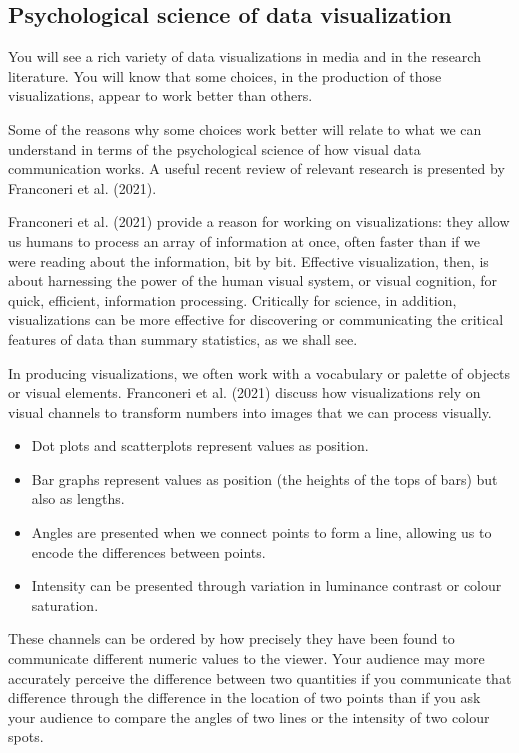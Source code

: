 \documentclass[
  letterpaper,
  DIV=11,
  numbers=noendperiod]{scrreprt}
\providecommand{\tightlist}{%
  \setlength{\itemsep}{0pt}\setlength{\parskip}{0pt}}\usepackage{longtable,booktabs,array}
\begin{document}
\hypertarget{sec-psychology-visualization}{%
\subsection{Psychological science of data
visualization}\label{sec-psychology-visualization}}

You will see a rich variety of data visualizations in media and in the
research literature. You will know that some choices, in the production
of those visualizations, appear to work better than others.

Some of the reasons why some choices work better will relate to what we
can understand in terms of the psychological science of how visual data
communication works. A useful recent review of relevant research is
presented by Franconeri et al. (2021).

Franconeri et al. (2021) provide a reason for working on visualizations:
they allow us humans to process an array of information at once, often
faster than if we were reading about the information, bit by bit.
Effective visualization, then, is about harnessing the power of the
human visual system, or visual cognition, for quick, efficient,
information processing. Critically for science, in addition,
visualizations can be more effective for discovering or communicating
the critical features of data than summary statistics, as we shall see.

In producing visualizations, we often work with a vocabulary or palette
of objects or visual elements. Franconeri et al. (2021) discuss how
visualizations rely on visual channels to transform numbers into images
that we can process visually.

\begin{itemize}
\tightlist
\item
  Dot plots and scatterplots represent values as position.
\item
  Bar graphs represent values as position (the heights of the tops of
  bars) but also as lengths.
\item
  Angles are presented when we connect points to form a line, allowing
  us to encode the differences between points.
\item
  Intensity can be presented through variation in luminance contrast or
  colour saturation.
\end{itemize}

These channels can be ordered by how precisely they have been found to
communicate different numeric values to the viewer. Your audience may
more accurately perceive the difference between two quantities if you
communicate that difference through the difference in the location of
two points than if you ask your audience to compare the angles of two
lines or the intensity of two colour spots.
\end{document}
